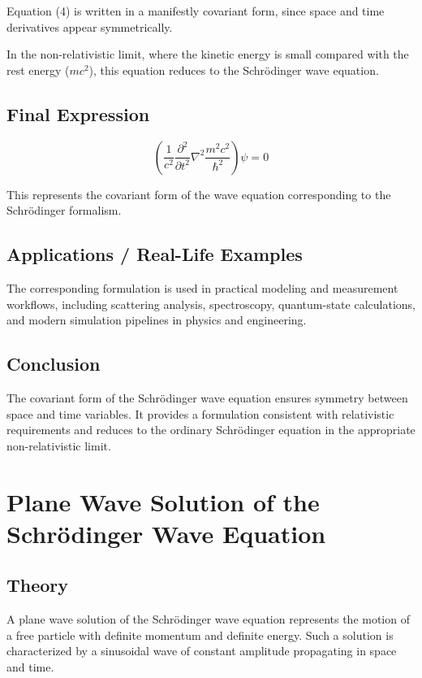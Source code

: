 \documentclass[12pt]{report}
\begin{document}
Equation (4) is written in a manifestly covariant form, since space and time derivatives appear symmetrically.

In the non-relativistic limit, where the kinetic energy is small compared with the rest energy ($mc^2$), this equation reduces to the Schrödinger wave equation.

\subsection*{Final Expression}

\begin{equation*}
\boxed{\left( \frac{1}{c^2}\frac{\partial^2}{\partial t^2}
\nabla^2
\frac{m^2 c^2}{\hbar^2} \right)\psi = 0}
\end{equation*}

This represents the covariant form of the wave equation corresponding to the Schrödinger formalism.

\subsection*{Applications / Real-Life Examples}
The corresponding formulation is used in practical modeling and measurement workflows, including scattering analysis, spectroscopy, quantum-state calculations, and modern simulation pipelines in physics and engineering.

\subsection*{Conclusion}

The covariant form of the Schrödinger wave equation ensures symmetry between space and time variables. It provides a formulation consistent with relativistic requirements and reduces to the ordinary Schrödinger equation in the appropriate non-relativistic limit.

\section{Plane Wave Solution of the Schrödinger Wave Equation}



\subsection*{Theory}

A plane wave solution of the Schrödinger wave equation represents the motion of a free particle with definite momentum and definite energy. Such a solution is characterized by a sinusoidal wave of constant amplitude propagating in space and time.
\end{document}
